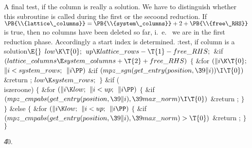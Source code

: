 A final test, if the column is really a solution.
We have to distinguish whether this subroutine is called during the first or
the secoond reduction.
If $\PB{\\{lattice\_columns}}= \PB{\\{system\_columns}}+2+\PB{\\{free\_RHS}}$
is true, then no columns have been deleted so far, i.~e.~ we are
in the first reduction phase. Accordingly a start index
 is determined.
\Y\B\4:test, if column is a solution\X${}\E{}$\6
$\\{low}\K\T{0};{}$\6
${}\\{up}\K\\{lattice\_rows}-\T{1}-\\{free\_RHS};{}$\6
\&{if} ${}(\\{lattice\_columns}\E\\{system\_columns}+\T{2}+\\{free\_RHS}){}$\5
${}\{{}$\1\6
\&{for} ${}(\|i\K\T{0};{}$ ${}\|i<\\{system\_rows};{}$ ${}\|i\PP){}$\1\6
\&{if} ${}(\\{mpz\_sgn}(\\{get\_entry}(\\{position},\39\|i))\I\T{0}){}$\1\5
\&{return} ;\2\2\6
${}\\{low}\K\\{system\_rows};{}$\6
\4${}\}{}$\2\6
\&{if} (\\{iszeroone})\5
${}\{{}$\1\6
\&{for} ${}(\|i\K\\{low};{}$ ${}\|i<\\{up};{}$ ${}\|i\PP){}$\5
${}\{{}$\1\6
\&{if} ${}(\\{mpz\_cmpabs}(\\{get\_entry}(\\{position},\39\|i),\39\\{max%
\_norm})\I\T{0}){}$\1\5
\&{return} ;\2\6
\4${}\}{}$\2\6
\4${}\}{}$\2\6
\&{else}\5
${}\{{}$\1\6
\&{for} ${}(\|i\K\\{low};{}$ ${}\|i<\\{up};{}$ ${}\|i\PP){}$\5
${}\{{}$\1\6
\&{if} ${}(\\{mpz\_cmpabs}(\\{get\_entry}(\\{position},\39\|i),\39\\{max%
\_norm})>\T{0}){}$\1\5
\&{return} ;\2\6
\4${}\}{}$\2\6
\4${}\}{}$\2\par
\U40.\fi

